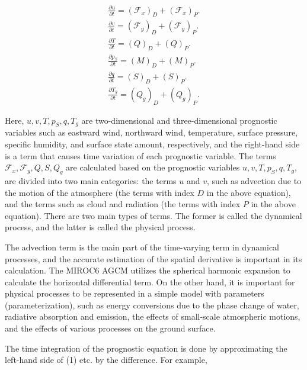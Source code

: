 \begin{eqnarray}
  \frac{\partial{u}}{\partial {t}}  =  \left( {\mathcal F}_x \right)_D + \left( {\mathcal F}_x \right)_P.
   \\
  \frac{\partial{v}}{\partial {t}}  =  \left( {\mathcal F}_y \right)_D + \left( {\mathcal F}_y \right)_P. \\
  \frac{\partial{T}}{\partial {t}}  =  \left( Q \right)_D + \left( Q \right)_P. \\
  \frac{\partial{p_S}}{\partial {t}}  =  \left( M \right)_D + \left( M \right)_P. \\
  \frac{\partial{q}}{\partial {t}}  =  \left( S \right)_D + \left( S \right)_P. \\
  \frac{\partial{T_g}}{\partial {t}}  =  \left( Q_g \right)_D + \left( Q_g \right)_P.
\end{eqnarray}

Here, \(u,v,T,p_S,q,T_g\) are two-dimensional and three-dimensional prognostic variables such as eastward wind, northward wind, temperature, surface pressure, specific humidity, and surface state
amount, respectively, and the right-hand side is a term that causes time variation of each prognostic variable. The terms \({\mathcal F}_x,{\mathcal F}_y,Q,S,Q_g\) are calculated based on the
prognostic variables \(u,v,T,p_S,q,T_g\), are divided into two main categories: the terms \(u\) and \(v\), such as advection due to the motion of the atmosphere (the terms with index \(D\) in the
above equation), and the terms such as cloud and radiation (the terms with index \(P\) in the above equation). There are two main types of terms. The former is called the dynamical process, and the
latter is called the physical process.

The advection term is the main part of the time-varying term in dynamical processes, and the accurate estimation of the spatial derivative is important in its calculation. The MIROC6 AGCM utilizes the
spherical harmonic expansion to calculate the horizontal differential term. On the other hand, it is important for physical processes to be represented in a simple model with parameters
(parameterization), such as energy conversions due to the phase change of water, radiative absorption and emission, the effects of small-scale atmospheric motions, and the effects of various processes
on the ground surface.

The time integration of the prognostic equation is done by approximating the left-hand side of (1) etc. by the difference. For example,

